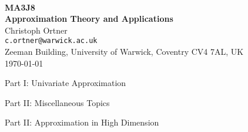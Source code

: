 \documentclass[a4paper, 11pt, reqno]{article}
\numberwithin{equation}{section}
\numberwithin{theorem}{section}
\begin{document}
\begin{center}
  \hfill \\[4cm]
  {\Large \bf MA3J8} \\[1mm]
  {\Large \bf Approximation Theory and Applications} \\[4mm]
  {\large Christoph Ortner} \\
  {\small \tt c.ortner@warwick.ac.uk} \\
  {\small Zeeman Building, University of Warwick, Coventry CV4 7AL, UK} \\[4mm]
  {\today}
\end{center}

\clearpage
\quad
\clearpage

\tableofcontents

\clearpage



\clearpage

\vspace{5cm}

{\huge Part I: Univariate Approximation}

\clearpage


\clearpage


\clearpage 

\vspace{5cm}

{\huge Part II: Miscellaneous Topics}


\clearpage


\clearpage


\clearpage


\clearpage 
\vspace{5cm} 

{\huge Part II: Approximation in High Dimension}

\clearpage 






\end{document}
